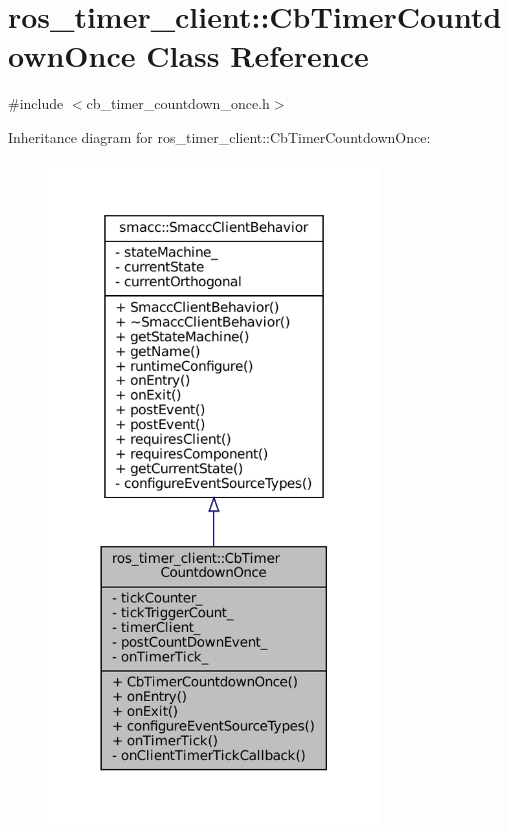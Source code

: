\hypertarget{classros__timer__client_1_1CbTimerCountdownOnce}{}\section{ros\+\_\+timer\+\_\+client\+:\+:Cb\+Timer\+Countdown\+Once Class Reference}
\label{classros__timer__client_1_1CbTimerCountdownOnce}


{\ttfamily \#include $<$cb\+\_\+timer\+\_\+countdown\+\_\+once.\+h$>$}



Inheritance diagram for ros\+\_\+timer\+\_\+client\+:\+:Cb\+Timer\+Countdown\+Once\+:
\nopagebreak
\begin{figure}[H]
\begin{center}
\leavevmode
\includegraphics[width=249pt]{classros__timer__client_1_1CbTimerCountdownOnce__inherit__graph}
\end{center}
\end{figure}


